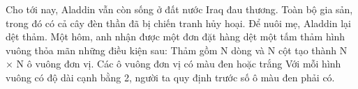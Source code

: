 Cho tới nay, Aladdin vẫn còn sống ở đất nước Iraq đau thương. Toàn bộ gia sản, trong đó có cả cây đèn thần đã bị chiến tranh hủy hoại. Để nuôi mẹ, Aladdin lại dệt thảm. Một hôm, anh nhận được một đơn đặt hàng dệt một tấm thảm hình vuông thỏa mãn những điều kiện sau:  Thảm gồm N dòng và N cột tạo thành N × N ô vuông đơn vị. Các ô vuông đơn vị có màu đen hoặc trắng  Với mỗi hình vuông có độ dài cạnh bằng 2, người ta quy định trước số ô màu đen phải có.
